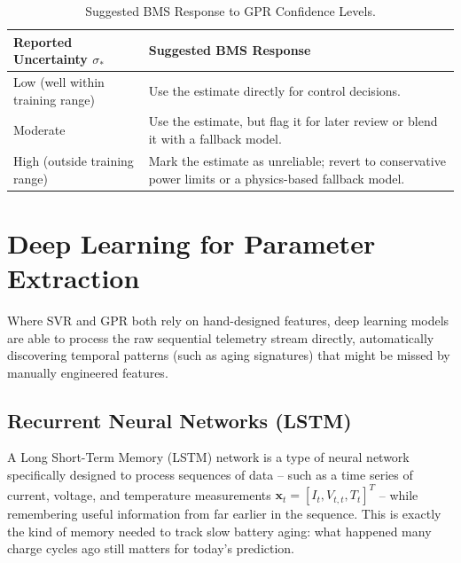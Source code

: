 \begin{table}[htbp]
\centering
\caption{Suggested BMS Response to GPR Confidence Levels.}
\label{tab:ch8_gpr_actions}
\renewcommand{\arraystretch}{1.3}
\footnotesize
\begin{tabularx}{\textwidth}{|p{2.6cm}|X|}
\hline
\textbf{Reported Uncertainty $\sigma_*$} & \textbf{Suggested BMS Response} \\
\hline
Low (well within training range) & Use the estimate directly for control decisions. \\
\hline
Moderate & Use the estimate, but flag it for later review or blend it with a fallback model. \\
\hline
High (outside training range) & Mark the estimate as unreliable; revert to conservative power limits or a physics-based fallback model. \\
\hline
\end{tabularx}
\end{table}


\section{Deep Learning for Parameter Extraction}
\label{sec:deep_learning}

Where SVR and GPR both rely on hand-designed features, deep learning models are able to process the raw sequential telemetry stream directly, automatically discovering temporal patterns (such as aging signatures) that might be missed by manually engineered features.

\subsection{Recurrent Neural Networks (LSTM)}
\label{subsec:lstm_details}

A Long Short-Term Memory (LSTM) network is a type of neural network specifically designed to process sequences of data -- such as a time series of current, voltage, and temperature measurements $\mathbf{x}_t = [I_t, V_{t,t}, T_t]^T$ -- while remembering useful information from far earlier in the sequence. This is exactly the kind of memory needed to track slow battery aging: what happened many charge cycles ago still matters for today's prediction.

